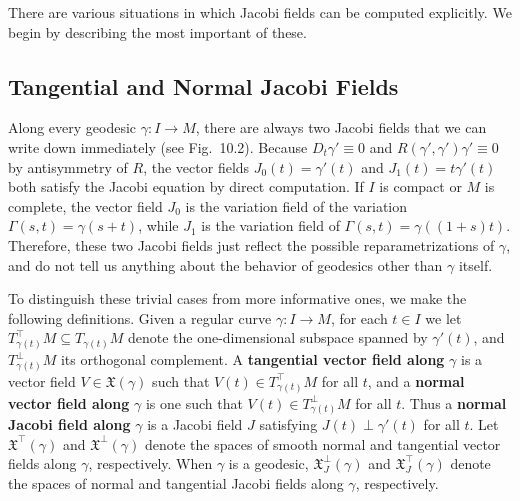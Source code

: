 There are various situations in which Jacobi fields can be computed explicitly. We begin by describing the most important of these.

\subsection{Tangential and Normal Jacobi Fields}

Along every geodesic $\gamma : I \to M$, there are always two Jacobi fields that we can write down immediately (see Fig.~10.2). Because $D_t \gamma' \equiv 0$ and $R(\gamma', \gamma')\gamma' \equiv 0$ by antisymmetry of $R$, the vector fields $J_0(t) = \gamma'(t)$ and $J_1(t) = t\gamma'(t)$ both satisfy the Jacobi equation by direct computation. If $I$ is compact or $M$ is complete, the vector field $J_0$ is the variation field of the variation $\Gamma(s,t) = \gamma(s + t)$, while $J_1$ is the variation field of $\Gamma(s,t) = \gamma((1 + s)t)$. Therefore, these two Jacobi fields just reflect the possible reparametrizations of $\gamma$, and do not tell us anything about the behavior of geodesics other than $\gamma$ itself.

To distinguish these trivial cases from more informative ones, we make the following definitions. Given a regular curve $\gamma : I \to M$, for each $t \in I$ we let $T^{\top}_{\gamma(t)} M \subseteq T_{\gamma(t)} M$ denote the one-dimensional subspace spanned by $\gamma'(t)$, and $T^{\perp}_{\gamma(t)} M$ its orthogonal complement. A \textbf{tangential vector field along} $\gamma$ is a vector field $V \in \mathfrak{X}(\gamma)$ such that $V(t) \in T^{\top}_{\gamma(t)} M$ for all $t$, and a \textbf{normal vector field along} $\gamma$ is one such that $V(t) \in T^{\perp}_{\gamma(t)} M$ for all $t$. Thus a \textbf{normal Jacobi field along} $\gamma$ is a Jacobi field $J$ satisfying $J(t) \perp \gamma'(t)$ for all $t$. Let $\mathfrak{X}^{\top}(\gamma)$ and $\mathfrak{X}^{\perp}(\gamma)$ denote the spaces of smooth normal and tangential vector fields along $\gamma$, respectively. When $\gamma$ is a geodesic, $\mathfrak{X}^{\perp}_J(\gamma)$ and $\mathfrak{X}^{\top}_J(\gamma)$ denote the spaces of normal and tangential Jacobi fields along $\gamma$, respectively.

